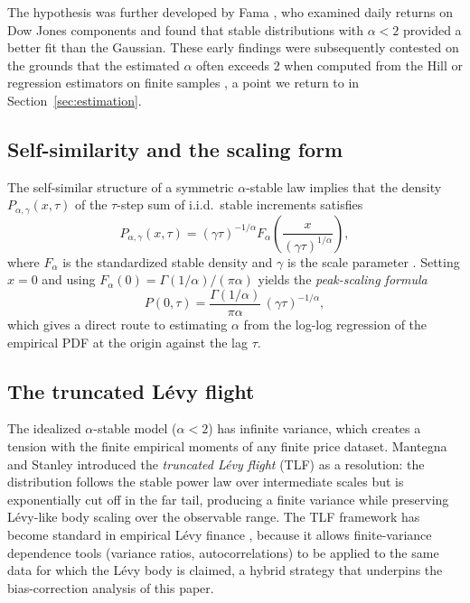 \documentclass[12pt,a4paper]{article}
\begin{document}
The hypothesis was further developed by Fama \cite{Fama1965}, who examined
daily returns on Dow Jones components and found that stable distributions with
$\alpha < 2$ provided a better fit than the Gaussian. These early findings were
subsequently contested on the grounds that the estimated $\alpha$ often exceeds
2 when computed from the Hill or regression estimators on finite samples
\cite{Weron2001}, a point we return to in Section~\ref{sec:estimation}.

\subsection{Self-similarity and the scaling form}

The self-similar structure of a symmetric $\alpha$-stable law implies that the
density $P_{\alpha,\gamma}(x,\tau)$ of the $\tau$-step sum of i.i.d.\ stable
increments satisfies
\begin{equation}
  P_{\alpha,\gamma}(x,\tau)
  = (\gamma\tau)^{-1/\alpha}
    F_\alpha\!\left(\frac{x}{(\gamma\tau)^{1/\alpha}}\right),
  \label{eq:scaling}
\end{equation}
where $F_\alpha$ is the standardized stable density and $\gamma$ is the scale
parameter \cite{SamorodTaqqu1994}. Setting $x = 0$ and using
$F_\alpha(0) = \Gamma(1/\alpha)/(\pi\alpha)$ yields the \textit{peak-scaling
formula}
\begin{equation}
  P(0,\tau) = \frac{\Gamma(1/\alpha)}{\pi\alpha}\,(\gamma\tau)^{-1/\alpha},
  \label{eq:peak}
\end{equation}
which gives a direct route to estimating $\alpha$ from the log-log regression
of the empirical PDF at the origin against the lag $\tau$.

\subsection{The truncated Lévy flight}

The idealized $\alpha$-stable model ($\alpha < 2$) has infinite variance, which
creates a tension with the finite empirical moments of any finite price dataset.
Mantegna and Stanley \cite{MantegnaStanley1994} introduced the \textit{truncated Lévy flight}
(TLF) as a resolution: the distribution follows the stable power law over
intermediate scales but is exponentially cut off in the far tail, producing a
finite variance while preserving Lévy-like body scaling over the observable
range. The TLF framework has become standard in empirical Lévy finance
\cite{BouchaudPotters2003,Cont2001,Mantegna1991}, because it allows
finite-variance dependence tools (variance ratios, autocorrelations) to be
applied to the same data for which the Lévy body is claimed, a hybrid
strategy that underpins the bias-correction analysis of this paper.
\end{document}
